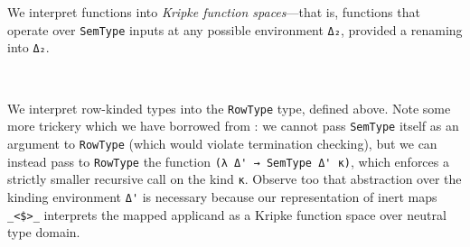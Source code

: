 \documentclass[authoryear, acmsmall, screen, review, nonacm]{acmart}
\begin{document}
\begin{code}%
\>[0]\AgdaSpace{}%
\AgdaSymbol{:}\AgdaSpace{}%
\AgdaSpace{}%
\AgdaSpace{}%
\AgdaSpace{}%
\AgdaSpace{}%
\<%
\\
\>[0]\AgdaSpace{}%
\AgdaSpace{}%
\AgdaSpace{}%
\AgdaSymbol{=}\AgdaSpace{}%
\AgdaSpace{}%
\AgdaSpace{}%
\<%
\\
\>[0]\AgdaSpace{}%
\AgdaSpace{}%
\AgdaSpace{}%
\AgdaSymbol{=}\AgdaSpace{}%
\AgdaSpace{}%
\AgdaSpace{}%
\<%
\end{code}

\Ni We interpret functions into \emph{Kripke function spaces}---that is, functions that operate over \verb!SemType! inputs at any possible environment \verb!Δ₂!, provided a renaming into \verb!Δ₂!.

\begin{code}%
\>[0]\AgdaSpace{}%
\AgdaSpace{}%
\AgdaSymbol{(}\AgdaSpace{}%
\AgdaSpace{}%
\AgdaSymbol{)}\AgdaSpace{}%
\AgdaSymbol{=}%
\>[4778I]\AgdaSpace{}%
\AgdaSymbol{\{}\AgdaSymbol{\}}\AgdaSpace{}%
\AgdaSpace{}%
\AgdaSymbol{(}\AgdaSpace{}%
\AgdaSymbol{:}\AgdaSpace{}%
\AgdaSpace{}%
\AgdaSpace{}%
\AgdaSymbol{)}\<%
\\
\>[.][@{}l@{}]\<[4778I]%
\>[24]\AgdaSymbol{(}\AgdaSpace{}%
\AgdaSymbol{:}\AgdaSpace{}%
\AgdaSpace{}%
\AgdaSpace{}%
\AgdaSymbol{)}\AgdaSpace{}%
\AgdaSpace{}%
\AgdaSpace{}%
\AgdaSpace{}%
\AgdaSymbol{)}\<%
\end{code}

We interpret row-kinded types into the \verb!RowType! type, defined above. Note some more trickery which we have borrowed from \citet{AllaisBM13}: we cannot pass \verb!SemType! itself as an argument to \verb!RowType! (which would violate termination checking), but we can instead pass to \verb!RowType! the function \verb!(λ Δ' → SemType Δ' κ)!, which enforces a strictly smaller recursive call on the kind \verb!κ!. Observe too that abstraction over the kinding environment \verb!Δ'! is necessary because our representation of inert maps \verb!_<$>_! interprets the mapped applicand as a Kripke function space over neutral type domain.
\end{document}
